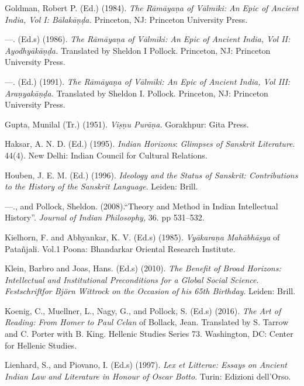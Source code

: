 \begin{thebibliography}{99}
 \item Goldman, Robert P. (Ed.) (1984). \textit{The Rāmāyaṇa of Vālmīki: An Epic of Ancient India, Vol I: Bālakāṇḍa. }Princeton, NJ: Princeton University Press.

 \item —. (Ed.s) (1986).\textit{ The Rāmāyaṇa of Vālmīki: An Epic of Ancient India, Vol II: Ayodhyākāṇḍa. }Translated by Sheldon I Pollock. Princeton, NJ: Princeton University Press.

 \item —. (Ed.) (1991). \textit{The Rāmāyaṇa of Vālmīki: An Epic of Ancient India, Vol III: Araṇyakāṇḍa.} Translated by Sheldon I. Pollock. Princeton, NJ: Princeton University Press.

 \item Gupta, Munilal (Tr.) (1951). \textit{Viṣṇu Purāṇa.} Gorakhpur: Gita Press.

 \item Haksar, A. N. D. (Ed.) (1995). \textit{Indian Horizons}: \textit{Glimpses of Sanskrit Literature}. 44(4). New Delhi: Indian Council for Cultural Relations.

 \item Houben, J. E. M. (Ed.) (1996). \textit{Ideology and the Status of Sanskrit: Contributions to the History of the Sanskrit Language}. Leiden: Brill.

 \item —., and Pollock, Sheldon. (2008).“Theory and Method in Indian Intellectual History”.\textit{ Journal of Indian Philosophy, }36. pp 531–532.

 \item Kielhorn, F. and Abhyankar, K. V. (Ed.s) (1985). \textit{Vyākaraṇa Mahābhāṣya} of Patañjali. Vol.1 Poona: Bhandarkar Oriental Research Institute.

 \item Klein, Barbro and Joas, Hans. (Ed.s) (2010).\textit{ The Benefit of Broad Horizons: Intellectual and Institutional Preconditions for a Global Social Science}. \textit{Festschriftfor Björn Wittrock on the Occasion of his 65th Birthday}. Leiden: Brill.

 \item Koenig, C., Muellner, L., Nagy, G., and Pollock, S. (Ed.s) (2016). \textit{The Art of Reading: From Homer to Paul Celan} of Bollack, Jean. Translated by S. Tarrow and C. Porter with B. King. Hellenic Studies Series 73. Washington, DC: Center for Hellenic Studies.

 \item Lienhard, S., and Piovano, I. (Ed.s) (1997). \textit{Lex et Litterae: Essays on Ancient Indian Law and Literature in Honour of Oscar Botto}. Turin: Edizioni dell’Orso.


\end{thebibliography}
